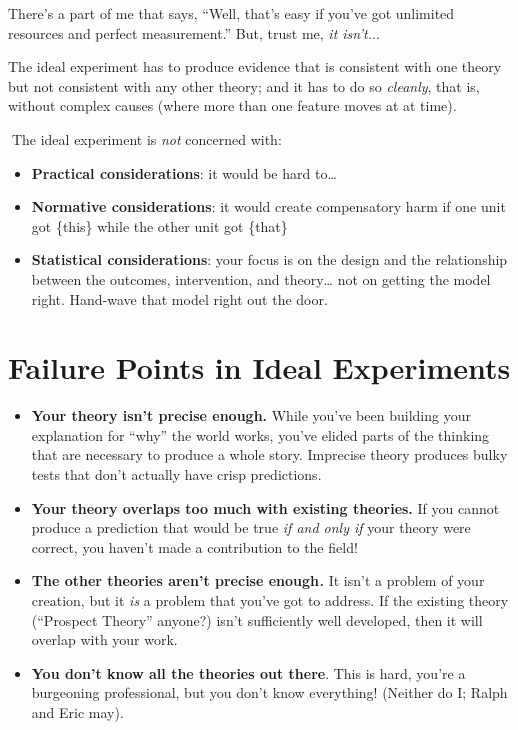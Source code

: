 \documentclass[
  letterpaper,
  DIV=11,
  numbers=noendperiod]{scrreprt}
\begin{document}
There's a part of me that says, ``Well, that's easy if you've got
unlimited resources and perfect measurement.'' But, trust me, \emph{it
isn't.}..

The ideal experiment has to produce evidence that is consistent with one
theory but not consistent with any other theory; and it has to do so
\emph{cleanly}, that is, without complex causes (where more than one
feature moves at at time).

🙅The ideal experiment is \emph{not} concerned with: 🙅

\begin{itemize}
\item
  \textbf{Practical considerations}: it would be hard to\ldots{}
\item
  \textbf{Normative considerations}: it would create compensatory harm
  if one unit got \{this\} while the other unit got \{that\}
\item
  \textbf{Statistical considerations}: your focus is on the design and
  the relationship between the outcomes, intervention, and
  theory\ldots{} not on getting the model right. Hand-wave that model
  right out the door.
\end{itemize}

\section{Failure Points in Ideal
Experiments}\label{failure-points-in-ideal-experiments}

\begin{itemize}
\item
  \textbf{Your theory isn't precise enough.} While you've been building
  your explanation for ``why'' the world works, you've elided parts of
  the thinking that are necessary to produce a whole story. Imprecise
  theory produces bulky tests that don't actually have crisp
  predictions.
\item
  \textbf{Your theory overlaps too much with existing theories.} If you
  cannot produce a prediction that would be true \emph{if and only if}
  your theory were correct, you haven't made a contribution to the
  field!
\item
  \textbf{The other theories aren't precise enough\emph{.}} It isn't a
  problem of your creation, but it \emph{is} a problem that you've got
  to address. If the existing theory (``Prospect Theory'' anyone?) isn't
  sufficiently well developed, then it will overlap with your work.
\item
  \textbf{You don't know all the theories out there}. This is hard,
  you're a burgeoning professional, but you don't know everything!
  (Neither do I; Ralph and Eric may).
\end{itemize}
\end{document}
